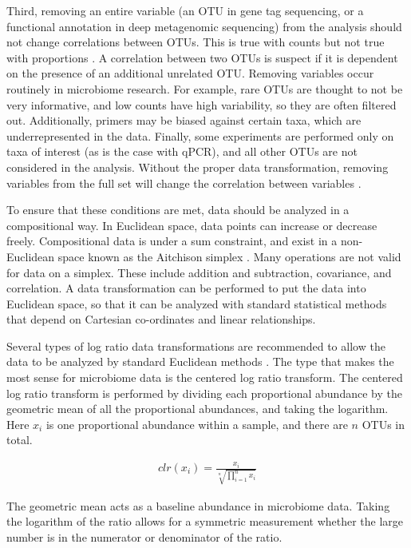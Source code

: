 Third, removing an entire variable (an OTU in gene tag sequencing, or a functional annotation in deep metagenomic sequencing) from the analysis should not change correlations between OTUs. This is true with counts but not true with proportions \cite{lovell2015proportionality}. A correlation between two OTUs is suspect if it is dependent on the presence of an additional unrelated OTU. Removing variables occur routinely in microbiome research. For example, rare OTUs are thought to not be very informative, and low counts have high variability, so they are often filtered out. Additionally, primers may be biased against certain taxa, which are underrepresented in the data. Finally, some experiments are performed only on taxa of interest (as is the case with qPCR), and all other OTUs are not considered in the analysis. Without the proper data transformation, removing variables from the full set will change the correlation between variables \cite{aitchison1982statistical}.

To ensure that these conditions are met, data should be analyzed in a compositional way. In Euclidean space, data points can increase or decrease freely. Compositional data is under a sum constraint, and exist in a non-Euclidean space known as the Aitchison simplex \cite{aitchison1982statistical}. Many operations are not valid for data on a simplex. These include addition and subtraction, covariance, and correlation. A data transformation can be performed to put the data into Euclidean space, so that it can be analyzed with standard statistical methods that depend on Cartesian co-ordinates and linear relationships.

Several types of log ratio data transformations are recommended to allow the data to be analyzed by standard Euclidean methods \cite{aitchison1982statistical}. The type that makes the most sense for microbiome data is the centered log ratio transform. The centered log ratio transform is performed by dividing each proportional abundance by the geometric mean of all the proportional abundances, and taking the logarithm. Here $x_i$ is one proportional abundance within a sample, and there are $n$ OTUs in total.

\begin{align*}
clr(x_i) = \frac{x_i}{\sqrt[n]{\prod_{i=1}^{n} x_i}}
\end{align*}

The geometric mean acts as a baseline abundance in microbiome data. Taking the logarithm of the ratio allows for a symmetric measurement whether the large number is in the numerator or denominator of the ratio.

